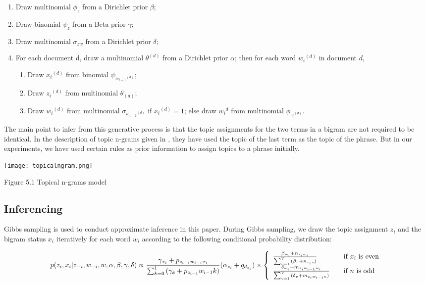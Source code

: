 \begin{enumerate}
 \item Draw multinomial \(\phi_z\) from a Dirichlet prior \(\beta\);
 \item Draw binomial \(\psi_z\) from a Beta prior \(\gamma\);
 \item Draw multinomial \(\sigma_{zw}\) from a Dirichlet prior \(\delta\);
 \item For each document d, draw a multinomial \(θ^{(d)}\) from a Dirichlet prior \(\alpha\); then for each word \({w_i}^{(d)}\) in document \(d\),
    \begin{enumerate}
     \item Draw \({x_i}^{(d)}\) from binomial \(\psi_{{w_{i-1}}^{(d)}}\);
     \item Draw \({z_i}^{(d)}\) from multinomial \(\theta_{(d)}\);
     \item Draw \({w_i}^{(d)}\) from multinomial \(\sigma_{{w_{i-1}}^{(d)}}\) if \({x_i}^{(d)} = 1\); else draw \({w_i}^{d}\) from multinomial \(\phi_{{z_i}^{(d)}}\).
    \end{enumerate}
\end{enumerate}

The main point to infer from this generative process is that the topic assignments for the two terms in a bigram are not required to be identical. In the description of
topic n-grams given in \citep*{wang2005note}, they have used the topic of the last term as the topic of the phrase. But in our experiments, we have used certain rules
as prior information to assign topics to a phrase initially.


\texttt{[image: topicalngram.png]} 
\begin{center}
 Figure 5.1 Topical n-grams model
\end{center}

\subsection{Inferencing}

Gibbs sampling is used to conduct approximate inference in this paper. During Gibbs sampling, we draw the topic assignment \(z_i\) and the bigram status \(x_i\) 
iteratively for each word \(w_i\) according to the following conditional probability distribution:

\begin{equation}
p(z_i,x_i | z_{-i},w_{-i},w,\alpha,\beta,\gamma,\delta) \propto
\frac{\gamma_{x_i} + p_{z_{i-1}w_{i-1}x_i}}{\sum_{k=0}^1 {(\gamma_k+p_{z_{i-1}}w_{i-1}k)}} {(\alpha_{z_i} + q_{d_{z_i}})} \times \left\{ 
  \begin{array}{l l}
    \frac{\beta_{w_i} + n_{z_i w_i}}{\sum_{v=1}^V {(\beta_v+n_{z_i v})}} & \quad \text{if $x_i$ is even}\\
    \frac{\delta_{w_i} + m_{z_i w_{i-1} w_i}}{\sum_{v=1}^V {(\delta_v + m_{z_i w_{i-1} v})} } & \quad \text{if $n$ is odd}
  \end{array} \right.
\end{equation}

